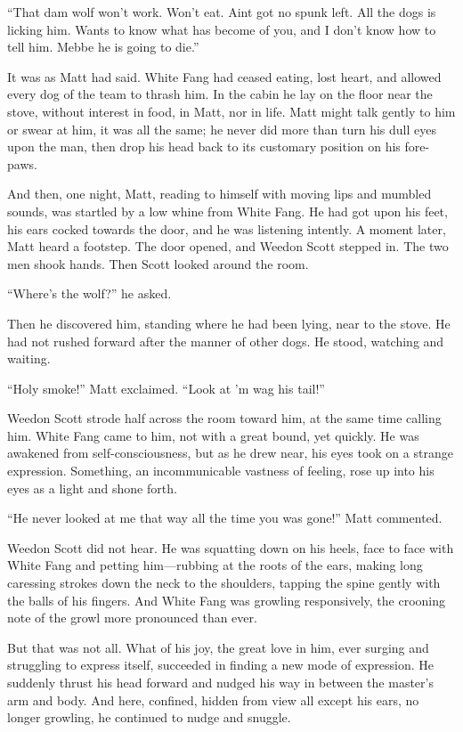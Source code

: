 \documentclass[10pt]{book}
\begin{document}
“That dam wolf won’t work. Won’t eat. Aint got no spunk left. All the
dogs is licking him. Wants to know what has become of you, and I don’t
know how to tell him. Mebbe he is going to die.”

It was as Matt had said. White Fang had ceased eating, lost heart, and
allowed every dog of the team to thrash him. In the cabin he lay on the
floor near the stove, without interest in food, in Matt, nor in life.
Matt might talk gently to him or swear at him, it was all the same; he
never did more than turn his dull eyes upon the man, then drop his head
back to its customary position on his fore-paws.

And then, one night, Matt, reading to himself with moving lips and
mumbled sounds, was startled by a low whine from White Fang. He had got
upon his feet, his ears cocked towards the door, and he was listening
intently. A moment later, Matt heard a footstep. The door opened, and
Weedon Scott stepped in. The two men shook hands. Then Scott looked
around the room.

“Where’s the wolf?” he asked.

Then he discovered him, standing where he had been lying, near to the
stove. He had not rushed forward after the manner of other dogs. He
stood, watching and waiting.

“Holy smoke!” Matt exclaimed. “Look at ’m wag his tail!”

Weedon Scott strode half across the room toward him, at the same time
calling him. White Fang came to him, not with a great bound, yet
quickly. He was awakened from self-consciousness, but as he drew near,
his eyes took on a strange expression. Something, an incommunicable
vastness of feeling, rose up into his eyes as a light and shone forth.

“He never looked at me that way all the time you was gone!” Matt
commented.

Weedon Scott did not hear. He was squatting down on his heels, face to
face with White Fang and petting him—rubbing at the roots of the ears,
making long caressing strokes down the neck to the shoulders, tapping
the spine gently with the balls of his fingers. And White Fang was
growling responsively, the crooning note of the growl more pronounced
than ever.

But that was not all. What of his joy, the great love in him, ever
surging and struggling to express itself, succeeded in finding a new
mode of expression. He suddenly thrust his head forward and nudged his
way in between the master’s arm and body. And here, confined, hidden
from view all except his ears, no longer growling, he continued to
nudge and snuggle.
\end{document}
